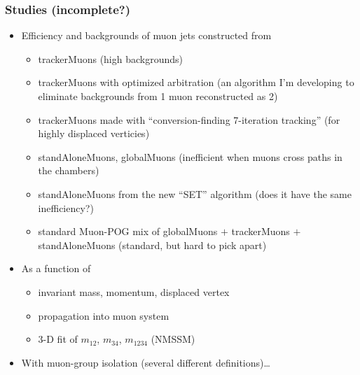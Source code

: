 \documentclass[compress]{beamer}
\begin{document}
\begin{frame}
\frametitle{Studies (incomplete?)}
\begin{itemize}
\item Efficiency and backgrounds of muon jets constructed from
\begin{itemize}
\item trackerMuons (high backgrounds)
\item trackerMuons with optimized arbitration (an algorithm I'm
  developing to eliminate backgrounds from 1 muon reconstructed as 2)
\item trackerMuons made with ``conversion-finding 7-iteration tracking'' (for highly displaced verticies)
\item standAloneMuons, globalMuons (inefficient when muons cross paths in the chambers)
\item standAloneMuons from the new ``SET'' algorithm (does it have the same inefficiency?)
\item standard Muon-POG mix of globalMuons $+$ trackerMuons $+$
  standAloneMuons (standard, but hard to pick apart)
\end{itemize}

\item As a function of
\begin{itemize}
\item invariant mass, momentum, displaced vertex
\item propagation into muon system
\item 3-D fit of $m_{12}$, $m_{34}$, $m_{1234}$ (NMSSM)
\end{itemize}

\item With muon-group isolation (several different definitions)\ldots
\end{itemize}

\label{numpages}
\end{frame}



\end{document}
